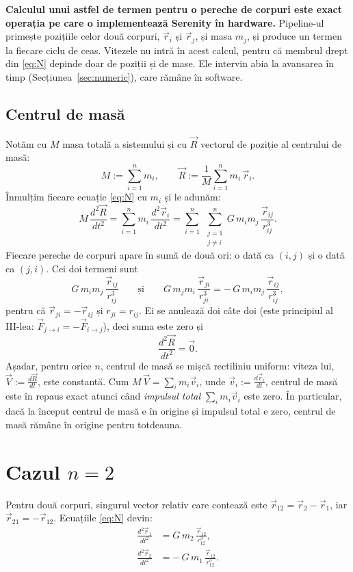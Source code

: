 \documentclass[11pt,a4paper]{article}
\newcommand{\vr}{\vec r}
\newcommand{\vv}{\vec v}
\newcommand{\vR}{\vec R}
\newcommand{\vV}{\vec V}
\newcommand{\od}[1]{\frac{d #1}{d t}}
\newcommand{\odd}[1]{\frac{d^{2} #1}{d t^{2}}}
\begin{document}
\textbf{Calculul unui astfel de termen pentru o pereche de corpuri este exact operația pe care o implementează Serenity în hardware.} Pipeline-ul primește pozițiile celor două corpuri, $\vr_i$ și $\vr_j$, și masa $m_j$, și produce un termen la fiecare ciclu de ceas. Vitezele nu intră în acest calcul, pentru că membrul drept din \eqref{eq:N} depinde doar de poziții și de mase. Ele intervin abia la avansarea în timp (Secțiunea~\ref{sec:numeric}), care rămâne în software.

\subsection*{Centrul de masă}
Notăm cu $M$ masa totală a sistemului și cu $\vR$ vectorul de poziție al centrului de masă:
\[
  M := \sum_{i=1}^{n} m_i, \qquad \vR := \frac{1}{M}\sum_{i=1}^{n} m_i\,\vr_i .
\]
Înmulțim fiecare ecuație \eqref{eq:N} cu $m_i$ și le adunăm:
\[
  M\,\odd{\vR} = \sum_{i=1}^{n} m_i\,\odd{\vr_i} = \sum_{i=1}^{n}\ \sum_{\substack{j=1\\ j\neq i}}^{n} G\,m_i m_j\,\frac{\vr_{ij}}{r_{ij}^{3}} .
\]
Fiecare pereche de corpuri apare în sumă de două ori: o dată ca $(i, j)$ și o dată ca $(j, i)$. Cei doi termeni sunt
\[
  G\,m_i m_j\,\frac{\vr_{ij}}{r_{ij}^{3}} \qquad\text{și}\qquad G\,m_j m_i\,\frac{\vr_{ji}}{r_{ji}^{3}} = -\,G\,m_i m_j\,\frac{\vr_{ij}}{r_{ij}^{3}},
\]
pentru că $\vr_{ji} = -\vr_{ij}$ și $r_{ji} = r_{ij}$. Ei se anulează doi câte doi (este principiul al III-lea: $\vec F_{j\to i} = -\vec F_{i\to j}$), deci suma este zero și
\[
  \odd{\vR} = \vec 0 .
\]
Așadar, pentru orice $n$, centrul de masă se mișcă rectiliniu uniform: viteza lui, $\vV := \od{\vR}$, este constantă. Cum $M\,\vV = \sum_i m_i \vv_i$, unde $\vv_i := \od{\vr_i}$, centrul de masă este în repaus exact atunci când \emph{impulsul total} $\sum_i m_i \vv_i$ este zero. În particular, dacă la început centrul de masă e în origine și impulsul total e zero, centrul de masă rămâne în origine pentru totdeauna.

\section{Cazul $n = 2$}\label{sec:N2}
Pentru două corpuri, singurul vector relativ care contează este $\vr_{12} = \vr_2 - \vr_1$, iar $\vr_{21} = -\vr_{12}$. Ecuațiile \eqref{eq:N} devin:
\begin{align}
  \odd{\vr_1} &= G\,m_2\,\frac{\vr_{12}}{r_{12}^{3}}, \label{eq:c1}\\
  \odd{\vr_2} &= -\,G\,m_1\,\frac{\vr_{12}}{r_{12}^{3}}. \label{eq:c2}
\end{align}
\end{document}
